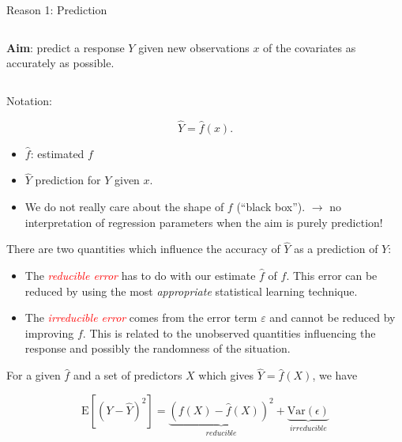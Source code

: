 \documentclass[ignorenonframetext,]{beamer}
\providecommand{\tightlist}{%
  \setlength{\itemsep}{0pt}\setlength{\parskip}{0pt}}
\begin{document}
\begin{frame}

\begin{block}{Reason 1: Prediction}

\(~\)

\textbf{Aim}: predict a response \(Y\) given new observations \(x\) of
the covariates as accurately as possible.

\(~\)

Notation:

\[\hat{Y} = \hat{f}(x).\]

\begin{itemize}
\item
  \(\hat{f}\): estimated \(f\)
\item
  \(\hat{Y}\) prediction for \(Y\) given \(x\).
\item
  We do not really care about the shape of \(f\) (``black box'').
  \(\rightarrow\) no interpretation of regression parameters when the
  aim is purely prediction!
\end{itemize}

\end{block}

\end{frame}

\begin{frame}

There are two quantities which influence the accuracy of \(\hat{Y}\) as
a prediction of \(Y\):

\begin{itemize}
\tightlist
\item
  The \emph{\textcolor{red}{reducible error}} has to do with our
  estimate \(\hat{f}\) of \(f\). This error can be reduced by using the
  most \emph{appropriate} statistical learning technique.
\item
  The \emph{\textcolor{red}{irreducible error}} comes from the error
  term \(\varepsilon\) and cannot be reduced by improving \(f\). This is
  related to the unobserved quantities influencing the response and
  possibly the randomness of the situation.
\end{itemize}

For a given \(\hat{f}\) and a set of predictors \(X\) which gives
\(\hat{Y}=\hat{f}(X)\), we have

\[\text{E}[(Y-\hat{Y})^2] = \underbrace{(f(X)-\hat{f}(X))^2}_{reducible} + \underbrace{\text{Var}(\epsilon)}_{irreducible}\]

\end{frame}
\end{document}
